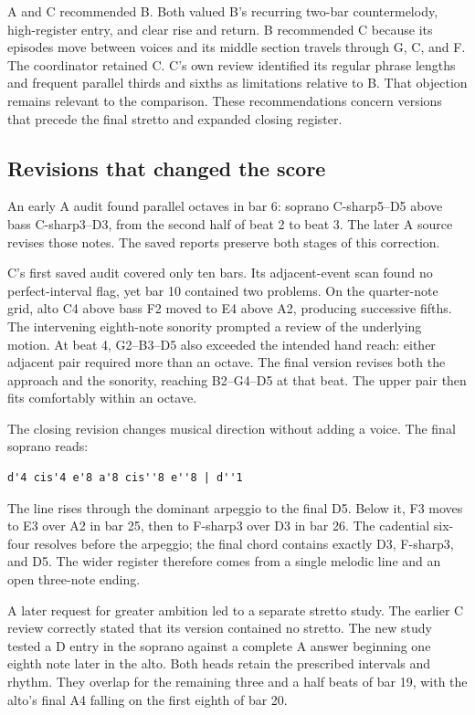 \documentclass[11pt,a4paper]{article}
\begin{document}
A and C recommended B. Both valued B's recurring two-bar countermelody, high-register entry, and clear rise and return. B recommended C because its episodes move between voices and its middle section travels through G, C, and F. The coordinator retained C. C's own review identified its regular phrase lengths and frequent parallel thirds and sixths as limitations relative to B. That objection remains relevant to the comparison. These recommendations concern versions that precede the final stretto and expanded closing register.

\subsection{Revisions that changed the score}\label{revisions-that-changed-the-score}

An early A audit found parallel octaves in bar 6: soprano C-sharp5--D5 above bass C-sharp3--D3, from the second half of beat 2 to beat 3. The later A source revises those notes. The saved reports preserve both stages of this correction.

C's first saved audit covered only ten bars. Its adjacent-event scan found no perfect-interval flag, yet bar 10 contained two problems. On the quarter-note grid, alto C4 above bass F2 moved to E4 above A2, producing successive fifths. The intervening eighth-note sonority prompted a review of the underlying motion. At beat 4, G2--B3--D5 also exceeded the intended hand reach: either adjacent pair required more than an octave. The final version revises both the approach and the sonority, reaching B2--G4--D5 at that beat. The upper pair then fits comfortably within an octave.

The closing revision changes musical direction without adding a voice. The final soprano reads:

\begin{verbatim}
d'4 cis'4 e'8 a'8 cis''8 e''8 | d''1
\end{verbatim}

The line rises through the dominant arpeggio to the final D5. Below it, F3 moves to E3 over A2 in bar 25, then to F-sharp3 over D3 in bar 26. The cadential six-four resolves before the arpeggio; the final chord contains exactly D3, F-sharp3, and D5. The wider register therefore comes from a single melodic line and an open three-note ending.

A later request for greater ambition led to a separate stretto study. The earlier C review correctly stated that its version contained no stretto. The new study tested a D entry in the soprano against a complete A answer beginning one eighth note later in the alto. Both heads retain the prescribed intervals and rhythm. They overlap for the remaining three and a half beats of bar 19, with the alto's final A4 falling on the first eighth of bar 20.
\end{document}
